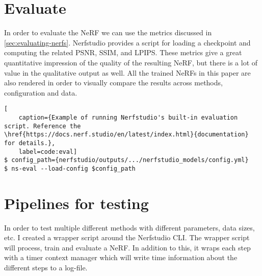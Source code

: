 \section{Evaluate}
In order to evaluate the NeRF we can use the metrics discussed in \autoref{sec:evaluating-nerfs}. Nerfstudio provides a script for loading a checkpoint and computing the related PSNR, SSIM, and LPIPS. These metrics give a great quantitative impression of the quality of the resulting NeRF, but there is a lot of value in the qualitative output as well. All the trained NeRFs in this paper are also rendered in order to visually compare the results across methods, configuration and data.

\begin{lstlisting}[
    caption={Example of running Nerfstudio's built-in evaluation script. Reference the \href{https://docs.nerf.studio/en/latest/index.html}{documentation} for details.},
    label=code:eval]
$ config_path={nerfstudio/outputs/.../nerfstudio_models/config.yml}
$ ns-eval --load-config $config_path
\end{lstlisting}


\section{Pipelines for testing}
In order to test multiple different methods with different parameters, data sizes, etc. I created a wrapper script around the Nerfstudio CLI. The wrapper script will process, train and evaluate a NeRF. In addition to this, it wraps each step with a timer context manager which will write time information about the different steps to a log-file.



